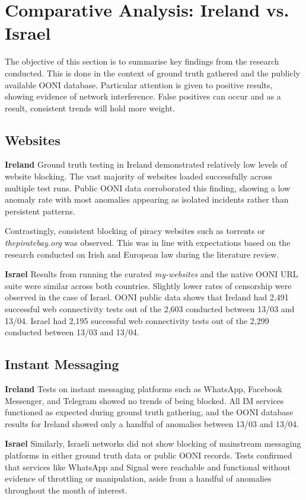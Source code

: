 \section{Comparative Analysis: Ireland vs. Israel}
The objective of this section is to summarise key findings from the research conducted. This is done in the context of ground truth gathered and the publicly available OONI database. Particular attention is given to positive results, showing evidence of network interference. False positives can occur and as a result, consistent trends will hold more weight.



\subsection{Websites}
\large\textbf{Ireland}
Ground truth testing in Ireland demonstrated relatively low levels of website blocking. The vast majority of websites loaded successfully across multiple test runs. Public OONI data corroborated this finding, showing a low anomaly rate with most anomalies appearing as isolated incidents rather than persistent patterns. 

Contrastingly, consistent blocking of piracy websites such as torrents or \textit{thepiratebay.org} was observed. This was in line with expectations based on the research conducted on Irish and European law during the literature review.

\large\textbf{Israel}
Results from running the curated \textit{my-websites} and the native OONI URL suite were similar across both countries. Slightly lower rates of censorship were observed in the case of Israel. OONI public data shows that Ireland had 2,491 successful web connectivity tests out of the 2,603 conducted between 13/03 and 13/04. Israel had 2,195 successful web connectivity tests out of the 2,299 conducted between 13/03 and 13/04.

\subsection{Instant Messaging}
\large\textbf{Ireland}
Tests on instant messaging platforms such as WhatsApp, Facebook Messenger, and Telegram showed no trends of being blocked. All IM services functioned as expected during ground truth gathering, and the OONI database results for Ireland showed only a handful of anomalies between 13/03 and 13/04.

\large\textbf{Israel}
Similarly, Israeli networks did not show blocking of mainstream messaging platforms in either ground truth data or public OONI records. Tests confirmed that services like WhatsApp and Signal were reachable and functional without evidence of throttling or manipulation, aside from a handful of anomalies throughout the month of interest.

